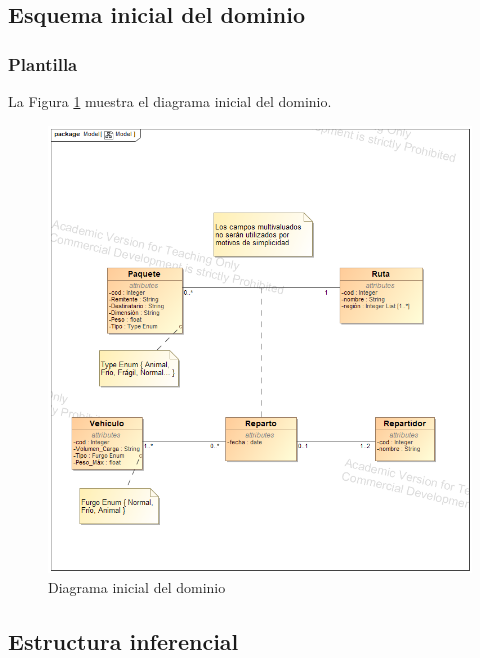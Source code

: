 \newpage

\subsection{Esquema inicial del dominio}

\subsubsection{Plantilla}
La Figura \ref{fig:DiagramaInicialDominio} muestra el diagrama inicial del dominio.

\begin{figure}[H]
  \centering
  \includegraphics[scale=0.50]{imaxes/DiagramaInicialDominio.png}
  \caption{\label{fig:DiagramaInicialDominio}Diagrama inicial del dominio}
\end{figure}

\subsection{Estructura inferencial}

